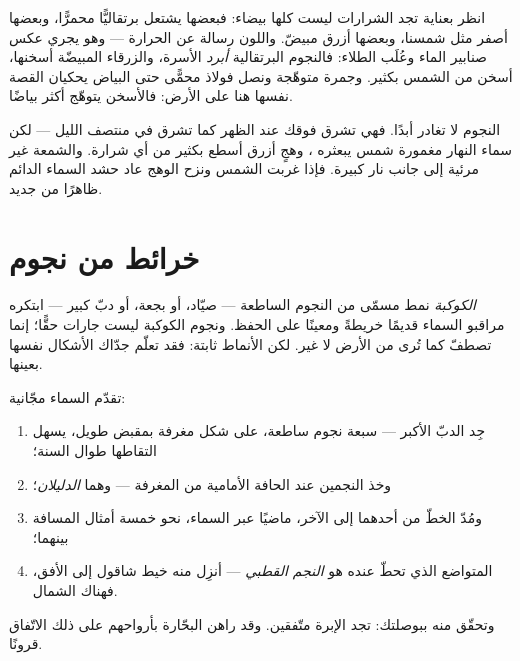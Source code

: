 \begin{example}\label{ex:g5:stars-night-sky:colors}
انظر بعناية تجد الشرارات ليست كلها بيضاء: فبعضها يشتعل برتقاليًّا
محمرًّا، وبعضها أصفر مثل شمسنا، وبعضها أزرق مبيضّ. واللون رسالة
عن الحرارة --- وهو يجري عكس صنابير الماء وعُلَب الطلاء: فالنجوم
البرتقالية \emph{أبرد} الأسرة، والزرقاء المبيضّة أسخنها، أسخن
من الشمس بكثير. وجمرة متوهّجة ونصل فولاذ محمًّى حتى البياض
يحكيان القصة نفسها هنا على الأرض: فالأسخن يتوهّج أكثر بياضًا.
\end{example}

\begin{remark}\label{rem:g5:stars-night-sky:daytime}
النجوم لا تغادر أبدًا. فهي تشرق فوقك عند الظهر كما تشرق في منتصف
الليل --- لكن سماء النهار مغمورة  شمس يبعثره ، وهجٍ
أزرق أسطع بكثير من أي شرارة. والشمعة غير مرئية إلى جانب نار
كبيرة. فإذا غربت الشمس ونزح الوهج عاد حشد السماء الدائم ظاهرًا
من جديد.
\end{remark}

\section{خرائط من نجوم}

\begin{definition}[الكوكبة]\label{def:g5:stars-night-sky:constellation}
\emph{الكوكبة} نمط مسمّى من النجوم الساطعة ---
صيّاد، أو بجعة، أو دبّ كبير --- ابتكره مراقبو السماء قديمًا
خريطةً ومعينًا على الحفظ. ونجوم الكوكبة ليست جارات حقًّا؛ إنما
تصطفّ كما تُرى من الأرض لا غير. لكن الأنماط ثابتة: فقد تعلّم
جدّاك الأشكال نفسها بعينها.
\end{definition}

\begin{method}\label{met:g5:stars-night-sky:northstar}
تقدّم السماء  مجّانية:
\begin{enumerate}
  \item جِد الدبّ الأكبر --- سبعة نجوم ساطعة، على شكل مغرفة
        بمقبض طويل، يسهل التقاطها طوال السنة؛
  \item وخذ النجمين عند الحافة الأمامية من المغرفة --- وهما
        \emph{الدليلان}؛
  \item ومُدّ الخطّ من أحدهما إلى الآخر، ماضيًا عبر السماء، نحو
        خمسة أمثال المسافة بينهما؛
  \item {} المتواضع الذي تحطّ عنده هو \emph{النجم
        القطبي} --- أنزِل منه خيط شاقول إلى
        الأفق، فهناك الشمال.
\end{enumerate}
وتحقّق منه ببوصلتك: تجد الإبرة  متّفقين. وقد راهن
البحّارة بأرواحهم على ذلك الاتّفاق قرونًا.
\end{method}

